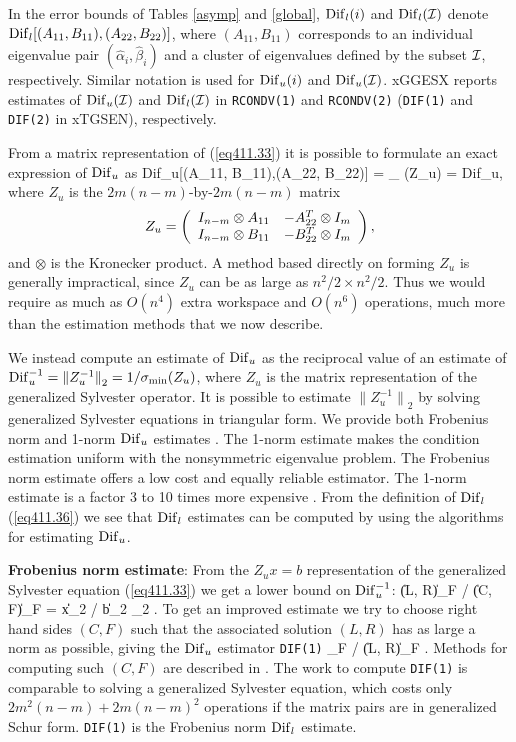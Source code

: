 In the error bounds of Tables \ref{asymp} and \ref{global},
${\rm Dif}_l(i)$ and ${\rm Dif}_l({\cal I})$ denote ${\rm Dif}_l[(A_{11},
B_{11}),(A_{22}, B_{22})]$, where $(A_{11}, B_{11})$ corresponds
to an individual eigenvalue pair $({\hat{\alpha}}_i, {\hat{\beta}}_i)$
and a cluster of eigenvalues
defined by the subset ${\cal I}$, respectively. Similar notation is used
for ${\rm Dif}_u(i)$ and ${\rm Dif}_u({\cal I})$. xGGESX reports estimates of
${\rm Dif}_u({\cal I})$ and ${\rm Dif}_l({\cal I})$ in {\tt RCONDV(1)}
and {\tt RCONDV(2)} ({\tt DIF(1)} and {\tt DIF(2)} in xTGSEN), respectively.

From a matrix representation of (\ref{eq411.33}) it is possible to formulate an
exact expression of ${\rm Dif}_u$ as
\bq\label{eq411.37}
{\rm Dif}_u[(A_{11}, B_{11}),(A_{22}, B_{22})]
= \sigma_{\min} (Z_u)
= {\rm Dif}_u,
\eq
where $Z_u$ is the $2m(n - m)$-by-$2m(n - m)$ matrix
\[
Z_u = \bmat{cc} I_{n-m} \otimes A_{11} & -A_{22}^T \otimes I_{m} \\
          I_{n-m} \otimes B_{11} & -B_{22}^T \otimes I_{m} \emat ,
\]
and $\otimes$ is the Kronecker product. A method
based directly on forming $Z_u$ is generally impractical,
since $Z_u$ can be as large as $n^2/2 \times n^2/2$.
Thus we would require as much as $O(n^4)$ extra workspace and $O(n^6)$
operations, much more than
the estimation methods that we now describe.

We instead compute an estimate of ${\rm Dif}_u$ as the reciprocal value of an
estimate of ${\rm Dif}_u^{-1} = {\|Z_u^{-1}\|}_2 = 1 / \sigma_{\min} (Z_u)$,
where $Z_u$ is the matrix representation of the generalized Sylvester
operator.  It is possible to estimate ${\|Z_u^{-1}\|}_2$ by solving
generalized Sylvester equations
in triangular form.
We provide both Frobenius norm and
1-norm ${\rm Dif}_u$ estimates \cite{kagstromporomaa93a}.
The 1-norm estimate makes the condition estimation uniform with the
nonsymmetric eigenvalue problem. The Frobenius norm estimate
offers a low cost and equally reliable estimator.
The 1-norm estimate is a factor 3 to 10 times more
expensive \cite{kagstromporomaa93a}. From
the definition of ${\rm Dif}_l$ (\ref{eq411.36}) we see that
${\rm Dif}_l$ estimates can be computed by using the algorithms for
estimating ${\rm Dif}_u$.

{\bf Frobenius norm estimate}: From
the $Z_ux = b$ representation of the
generalized Sylvester equation (\ref{eq411.33}) we get a
lower bound on ${\rm Dif}_u^{-1}$:
\bq\label{eq411.37a}
{\|(L, R)\|}_F / {\|(C, F)\|}_F = {\|x\|}_2 / {\|b\|}_2 _2 .
\eq
To get an improved estimate we try to choose right hand sides
$(C, F)$ such that
the associated solution $(L, R)$ has as large a norm as possible, giving the
${\rm Dif}_u$ estimator
\bq\label{eq411.38}
{\tt DIF(1)} _F / {\|(L, R)\|}_F  .
\eq
Methods for computing such $(C, F)$ are described in
\cite{kagstromwestin89,kagstromporomaa93a}.
The work to compute {\tt DIF(1)} is comparable to solving a generalized
Sylvester equation, which costs only $2m^2(n-m) + 2m(n-m)^2$
operations if the matrix pairs are in generalized Schur form.
{\tt DIF(1)} is the Frobenius norm ${\rm Dif}_l$ estimate.

